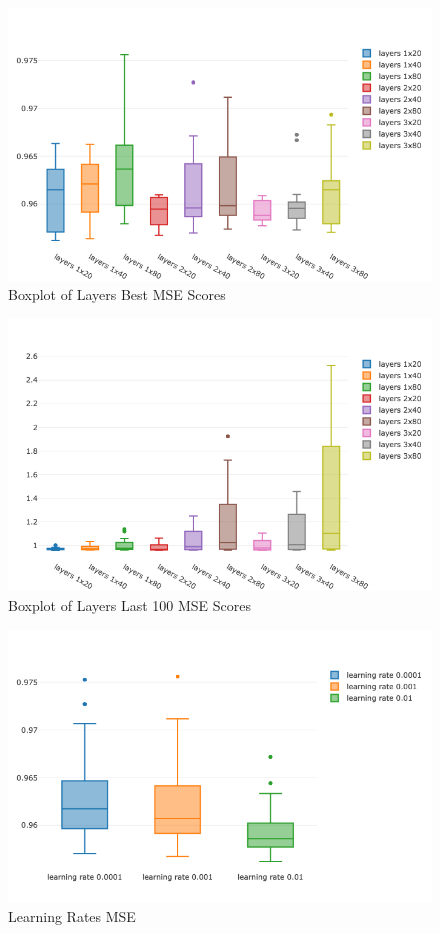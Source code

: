 \documentclass[a4paper,latin]{paper}
\begin{document}
\begin{figure}[H]
	\centering \includegraphics[scale=0.5]{images/synthetic_results/bp_layers_best_mse.png}
	\caption{Boxplot of Layers Best MSE Scores}
	\label{figure-synthetic-layer-best}
\end{figure}

\begin{figure}[H]
	\centering \includegraphics[scale=0.5]{images/synthetic_results/bp_layers_last_mse.png}
	\caption{Boxplot of Layers Last 100 MSE Scores}
	\label{figure-synthetic-layer-last}
\end{figure}

\begin{figure}[H]
	\centering \includegraphics[scale=0.5]{images/synthetic_results/bp_lr_mse.png}
	\caption{Learning Rates MSE}
	\label{figure-synthetic-lr-mse}
\end{figure}
\end{document}

